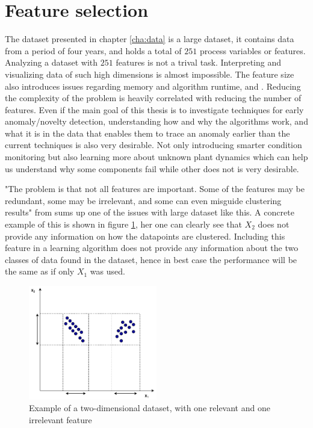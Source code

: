 \section{Feature selection}\label{sec:feature_selec}
    The dataset presented in chapter \ref{cha:data} is a large dataset, it contains data from a period of four years, and holds a total of $251$ process variables or features. Analyzing a dataset with $251$ features is not a trival task. Interpreting and visualizing data of such high dimensions is almost impossible. The feature size also introduces issues regarding memory and algorithm runtime, \cite{Guyon2003} and \cite{Dy2004}. Reducing the complexity of the problem is heavily correlated with reducing the number of features. Even if the main goal of this thesis is to investigate techniques for early anomaly/novelty detection, understanding how and why the algorithms work, and what it is in the data that enables them to trace an anomaly earlier than the current techniques is also very desirable. Not only introducing smarter condition monitoring but also learning more about unknown plant dynamics which can help us understand why some components fail while other does not is very desirable. 
    
    "The problem is that not all features are important. Some of the features may be redundant, some may be irrelevant, and some can even misguide clustering results" from \cite{Dy2004} sums up one of the issues with large dataset like this. A concrete example of this is shown in figure \ref{fig:feature_selection}, her one can clearly see that $X_2$ does not provide any information on how the datapoints are clustered. Including this feature in a learning algorithm does not provide any information about the two classes of data found in the dataset, hence in best case the performance will be the same as if only $X_1$ was used.  
    
    \begin{figure}
        \centering
        \includegraphics[width=0.5\textwidth]{report/figures/techniques/feature_selection.pdf}
        \caption{Example of a two-dimensional dataset, with one relevant and one irrelevant feature}
        \label{fig:feature_selection}
    \end{figure}
    
